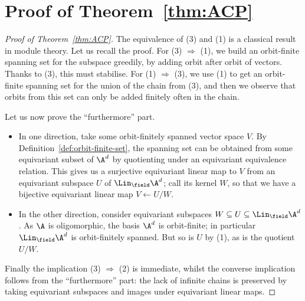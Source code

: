 \section{Proof of Theorem~\ref{thm:ACP}}\label{sec:appendix-modules}
\begin{proof}[Proof of Theorem~\ref{thm:ACP}]
    The equivalence of (3) and (1) is a classical result in module theory. 
    Let us recall the proof. 
    For (3) $\Rightarrow$ (1), we build an orbit-finite spanning set for the subspace greedily, by adding orbit after orbit of vectors. 
    Thanks to (3), this must stabilise. 
    For (1) $\Rightarrow$ (3), we use (1) to get an orbit-finite spanning set for the union of the chain from (3), 
    and then we observe that orbits from this set can only be added finitely often in the chain. 

    Let us now prove the ``furthermore'' part. 
    \begin{itemize}
        \item 
        In one direction, take some orbit-finitely spanned vector space $V$. 
        By Definition~\ref{def:orbit-finite-set}, the spanning set can be obtained from some equivariant subset of $\A^d$ by quotienting under an equivariant equivalence relation. 
        This gives us a surjective equivariant linear map to $V$ from an equivariant subspace $U$ of $\Lin_\field \A^d$; 
        call its kernel $W$, so that we have a bijective equivariant linear map $V \leftarrow U/W$. 

        \item 
        In the other direction, consider equivariant subspaces $W \subseteq U \subseteq \Lin_\field \A^d$.
        As $\A$ is oligomorphic, the basis $\A^d$ is orbit-finite; 
        in particular $\Lin_\field \A^d$ is orbit-finitely spanned.
        But so is $U$ by (1), as is the quotient $U/W$. 
    \end{itemize}

    Finally the implication (3) $\Rightarrow$ (2) is immediate, 
    whilst the converse implication follows from the ``furthermore'' part: 
    the lack of infinite chains is preserved by taking equivariant subspaces and images under equivariant linear maps. 
\end{proof}

